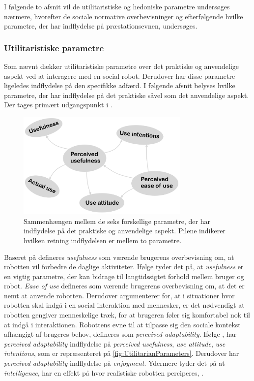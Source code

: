 I følgende to afsnit vil de utilitaristiske og hedoniske parametre undersøges nærmere, hvorefter de sociale normative overbevisninger og efterfølgende hvilke parametre, der har indflydelse på præstationsevnen, undersøges.
%   
\vfill
\subsubsection*{Utilitaristiske parametre}
\label{InteraktionSocialeRobotterParametreUtilitarian}
%
Som nævnt dækker utilitaristiske parametre over det praktiske og anvendelige aspekt ved at interagere med en social robot. Derudover har disse parametre ligeledes indflydelse på den specifikke adfærd. I følgende afsnit belyses hvilke parametre, der har indflydelse på det praktiske såvel som det anvendelige aspekt. Der tages primært udgangspunkt i \textcite[s. 1477]{PDF:SharingALifeHarvey}.
%
\begin{figure}[H]
\centering
\includegraphics[width = 0.75\textwidth]{Figure/UtilitarianParameters} 
\caption{Sammenhængen mellem de seks forskellige parametre, der har indflydelse på det praktiske og anvendelige aspekt. Pilene indikerer hvilken retning indflydelsen er mellem to parametre.}
\label{fig:UtilitarianParameters}
\end{figure}
\noindent 
%
Baseret på \textcite[s. 1477]{PDF:SharingALifeHarvey} defineres \textit{usefulness} som værende brugerens overbevisning om, at robotten vil forbedre de daglige aktiviteter. Ifølge \textcite[s. 11]{PDF:SharingALifeHarvey} tyder det på, at \textit{usefulness} er en vigtig parametre, der kan bidrage til langtidssigtet forhold mellem bruger og robot. \textit{Ease of use} defineres som værende brugerens overbevisning om, at det er nemt at anvende robotten. Derudover argumenterer \textcite[s. 1477]{PDF:SharingALifeHarvey} for, at i situationer hvor robotten skal indgå i en social interaktion med mennesker, er det nødvendigt at robotten gengiver menneskelige træk, for at brugeren føler sig komfortabel nok til at indgå i interaktionen. Robottens evne til at tilpasse sig den sociale kontekst afhængigt af brugeres behov, defineres som \textit{perceived adaptability}. Ifølge \textcite[s. 1477]{PDF:SharingALifeHarvey}, har \textit{perceived adaptability} indflydelse på \textit{perceived usefulness}, \textit{use attitude}, \textit{use intentions}, som er repræsenteret på \autoref{fig:UtilitarianParameters}. Derudover har \textit{perceived adaptability} indflydelse på \textit{enjoyment}. Ydermere tyder det på at \textit{intelligence}, har en effekt på hvor realistiske robotten perciperes, \parencite[s. 1477]{PDF:ExploringInfluencingVariable}.   
%
